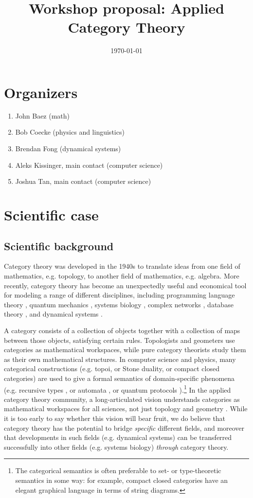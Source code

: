 \documentclass{article}
\title{Workshop proposal: Applied Category Theory}
\date{\today}
\begin{document}
\maketitle

\section{Organizers}
\begin{enumerate}
\item John Baez (math)
\item Bob Coecke (physics and linguistics) 
\item Brendan Fong (dynamical systems)
\item Aleks Kissinger, main contact (computer science)
\item Joshua Tan, main contact (computer science)
\end{enumerate}

\section{Scientific case}
\subsection{Scientific background}
Category theory was developed in the 1940s to translate ideas from one field of mathematics, e.g. topology, to another field of mathematics, e.g. algebra. More recently, category theory has become an unexpectedly useful and economical tool for modeling a range of different disciplines, including programming language theory \cite{abramsky}, quantum mechanics \cite{coecke}, systems biology \cite{cardelli}, complex networks \cite{baez}, database theory \cite{rosebrugh}, and dynamical systems \cite{spivak}.

A category consists of a collection of objects together with a collection of maps between those objects, satisfying certain rules. Topologists and geometers use categories as mathematical workspaces, while pure category theorists study them as their own mathematical structures. In computer science and physics, many categorical constructions (e.g. topoi, or Stone duality, or compact closed categories) are used to give a formal semantics of domain-specific phenomena (e.g. recursive types \cite{simpson}, or automata \cite{pippenger}, or quantum protocols \cite{abramsky_coecke}).\footnote{The categorical semantics is often preferable to set- or type-theoretic semantics in some way: for example, compact closed categories have an elegant graphical language in terms of string diagrams.} In the applied category theory community, a long-articulated vision understands categories as mathematical workspaces for all sciences, not just topology and geometry \cite{spivak_book}. While it is too early to say whether this vision will bear fruit, we do believe that category theory has the potential to bridge \emph{specific} different fields, and moreover that developments in such fields (e.g. dynamical systems) can be transferred successfully into other fields (e.g. systems biology) \emph{through} category theory.
\end{document}
